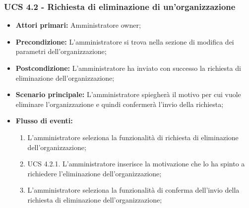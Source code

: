 \subsubsection{UCS 4.2 - Richiesta di eliminazione di un'organizzazione}%
\begin{itemize}
\item \textbf{Attori primari:} Amministratore owner;
\item \textbf{Precondizione:} L'amministratore si trova nella sezione di modifica dei parametri dell'organizzazione;
\item \textbf{Postcondizione:} L'amministratore ha inviato con successo la richiesta di eliminazione dell'organizzazione;
\item \textbf{Scenario principale:} L'amministratore spiegherà il motivo per cui vuole eliminare l'organizzazione e quindi confermerà l'invio della richiesta;
\item \textbf{Flusso di eventi:}
\begin{enumerate}
    \item L'amministratore seleziona la funzionalità di richiesta di eliminazione dell'organizzazione;
    \item UCS 4.2.1. L'amministratore inserisce la motivazione che lo ha spinto a richiedere l'eliminazione dell'organizzazione;
    \item L'amministratore seleziona la funzionalità di conferma dell'invio della richiesta di eliminazione dell'organizzazione;
\end{enumerate}
\end{itemize}